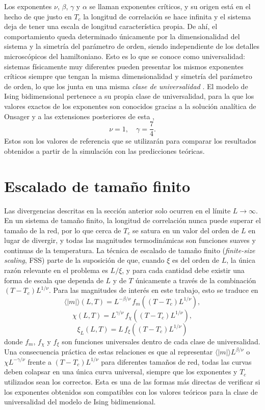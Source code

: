 Los exponentes $\nu$, $\beta$, $\gamma$ y $\alpha$ se llaman exponentes críticos, y su origen está en el hecho de que justo en $T_c$ la longitud de correlación se hace infinita y el sistema deja de tener una escala de longitud característica propia. De ahí, el comportamiento queda determinado únicamente por la dimensionalidad del sistema y la simetría del parámetro de orden, siendo independiente de los detalles microscópicos del hamiltoniano. Esto es lo que se conoce como universalidad: sistemas físicamente muy diferentes pueden presentar los mismos exponentes críticos siempre que tengan la misma dimensionalidad y simetría del parámetro de orden, lo que los junta en una misma \textit{clase de universalidad} \citep{Wilson1974}. El modelo de Ising bidimensional pertenece a su propia clase de universalidad, para la que los valores exactos de los exponentes son conocidos gracias a la solución analítica de Onsager y a las extensiones posteriores de esta \citep{Yang1952},
\[
\nu = 1,\quad \gamma = \frac{7}{4}.
\]
Estos son los valores de referencia que se utilizarán para comparar los resultados obtenidos a partir de la simulación con las predicciones teóricas.

\section{Escalado de tamaño finito} \label{sec:fss}

Las divergencias descritas en la sección anterior solo ocurren en el límite $L\to\infty$. En un sistema de tamaño finito, la longitud de correlación nunca puede superar el tamaño de la red, por lo que cerca de $T_c$ se satura en un valor del orden de $L$ en lugar de divergir, y todas las magnitudes termodinámicas son funciones suaves y continuas de la temperatura. La técnica de escalado de tamaño finito (\textit{finite-size scaling}, FSS) \citep{Fisher1972} parte de la suposición de que, cuando $\xi$ es del orden de $L$, la única razón relevante en el problema es $L/\xi$, y para cada cantidad debe existir una forma de escala que dependa de $L$ y de $T$ únicamente a través de la combinación $(T-T_c)L^{1/\nu}$. Para las magnitudes de interés en este trabajo, esto se traduce en
\[
\langle |m| \rangle (L,T) = L^{-\beta/\nu}\, f_m\!\left((T-T_c)L^{1/\nu}\right),
\]
\begin{equation} \label{eq:fss_chi2}
    \chi(L,T) = L^{\gamma/\nu}\, f_\chi\!\left((T-T_c)L^{1/\nu}\right),
\end{equation}
\begin{equation} \label{eq:fss_xi2}
    \xi_L(L,T) = L\, f_\xi\!\left((T-T_c)L^{1/\nu}\right)
\end{equation}
donde $f_m$, $f_\chi$ y $f_\xi$ son funciones universales dentro de cada clase de universalidad. Una consecuencia práctica de estas relaciones es que al representar $\langle|m|\rangle L^{\beta/\nu}$ o $\chi L^{-\gamma/\nu}$ frente a $(T-T_c)L^{1/\nu}$ para diferentes tamaños de red, todas las curvas deben colapsar en una única curva universal, siempre que los exponentes y $T_c$ utilizados sean los correctos. Esta es una de las formas más directas de verificar si los exponentes obtenidos son compatibles con los valores teóricos para la clase de universalidad del modelo de Ising bidimensional.

